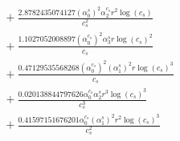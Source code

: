 \documentclass[10pt]{article}
\begin{document}
\begin{align*}
&{}  + \frac{2.8782435074127 \left(\alpha_{0}^s\right)^{2} \alpha_{2}^{c_s} r^{2} \log{\left(c_{s} \right)}}{c_{s}^{2}} \\
&{}  + \frac{1.1027052008897 \left(\alpha_{0}^{c_s}\right)^{2} \alpha_{3}^s r \log{\left(c_{s} \right)}^{2}}{c_{s}} \\
&{}  + \frac{0.47129535568268 \left(\alpha_{0}^{c_s}\right)^{2} \left(\alpha_{1}^s\right)^{2} r \log{\left(c_{s} \right)}^{3}}{c_{s}} \\
&{}  + \frac{0.020138844797626 \alpha_{0}^{c_s} \alpha_{2}^s r^{3} \log{\left(c_{s} \right)}^{3}}{c_{s}^{3}} \\
&{}  + \frac{0.41597151676201 \alpha_{0}^{c_s} \left(\alpha_{1}^s\right)^{2} r^{2} \log{\left(c_{s} \right)}^{3}}{c_{s}^{2}}
\end{align*}
\end{document}
